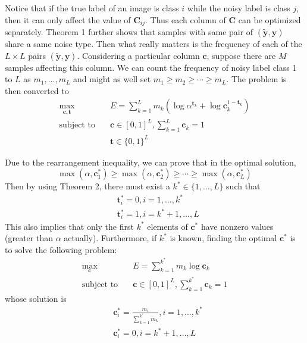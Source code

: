 \documentclass[10pt,twocolumn,letterpaper]{article}
\def\vec{\mathbf}
\def\mat{\mathbf}
\begin{document}
Notice that if the true label of an image is class $i$ while the noisy label is class $j$, then it can only affect the value of $\mat{C}_{ij}$. Thus each column of $\mat{C}$ can be optimized separately. Theorem 1 further shows that samples with same pair of $(\tilde{\vec{y}},\vec{y})$ share a same noise type. Then what really matters is the frequency of each of the $L\times L$ pairs $(\tilde{\vec{y}},\vec{y})$. Considering a particular column $\vec{c}$, suppose there are $M$ samples affecting this column. We can count the frequency of noisy label class 1 to $L$ as $m_1,\dots,m_L$ and might as well set $m_1\geq m_2\geq \cdots \geq m_L$. The problem is then converted to
\begin{equation}
\begin{aligned}
\max_{\vec{c},\vec{t}} \quad & E=\sum_{k=1}^{L} m_k \left(\log \alpha^{\vec{t}_k} + \log \mat{c}_k^{1-\vec{t}_k}\right)\\
\text{subject to} \quad & \vec{c} \in [0,1]^L, \sum_{k=1}^{L} \vec{c}_k = 1 \\
                    & \vec{t} \in \{0,1\}^{L}
\end{aligned}
\end{equation}

Due to the rearrangement inequality, we can prove that in the optimal solution,
\begin{equation}
    \max(\alpha,\vec{c}^*_1) \geq \max(\alpha,\vec{c}^*_2) \geq \cdots \geq \max(\alpha,\vec{c}^*_L)
\end{equation}
Then by using Theorem 2, there must exist a $k^* \in \{1,\dots,L\}$ such that
\begin{equation} \label{eq:opt_t}
\begin{aligned}
    &\vec{t}^*_i = 0, i = 1,\dots,k^* \\
    &\vec{t}^*_i = 1, i = k^*+1,\dots,L
\end{aligned}
\end{equation}
This also implies that only the first $k^*$ elements of $\vec{c}^*$ have nonzero values (greater than $\alpha$ actually). Furthermore, if $k^*$ is known, finding the optimal $\vec{c}^*$ is to solve the following problem:
\begin{equation}
\begin{aligned}
\max_{\vec{c}} \quad & E=\sum_{k=1}^{k^*} m_k \log \mat{c}_k\\
\text{subject to} \quad & \vec{c} \in [0,1]^L, \sum_{k=1}^{k^*} \vec{c}_k = 1
\end{aligned}
\end{equation}
whose solution is
\begin{equation} \label{eq:opt_c}
\begin{aligned}
    &\vec{c}^*_i = \frac{m_i}{\sum_{k=1}^{k^*}{m_k}}, i = 1,\dots,k^* \\
    &\vec{c}^*_i = 0, i = k^*+1,\dots,L
\end{aligned}
\end{equation}
\end{document}
